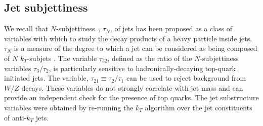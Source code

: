 \subsection{Jet subjettiness}

We recall that $N$-subjettiness~\cite{Ellis:2009su,Thaler:2010tr}, $\tau_{N}$, of jets has been proposed
as a class of variables with which to study the decay products of a heavy particle inside jets.  $\tau_{N}$ is a measure of the degree to which a jet can be considered as being composed of
 $N$  $k_{T}$-subjets \cite{Thaler:2010tr}. 
The variable $\tau_{32}$, defined as the ratio of the $N$-subjettiness variables $\tau_3/\tau_2$, is particularly sensitive to hadronically-decaying
 top-quark initiated jets.
The variable, $\tau_{21} \equiv \tau_2/\tau_1$ can be used to reject background from $W/Z$ decays.
These variables do not strongly correlate with jet mass and can provide an independent check for the
presence of top quarks.
The jet substructure variables were obtained by re-running the $k_T$ algorithm over the jet constituents of anti-$k_T$ jets.

